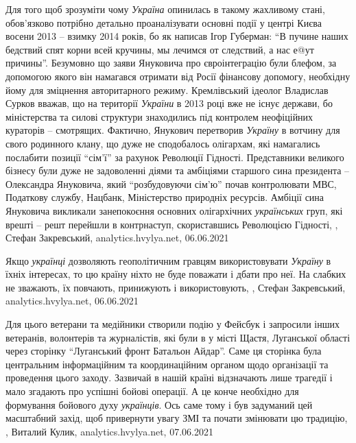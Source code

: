 Для того щоб зрозуміти чому \emph{Україна} опинилась в такому жахливому стані,
обов'язково потрібно детально проаналізувати основні події у центрі Києва
восени 2013 – взимку 2014 років, бо як написав Ігор Губерман: \enquote{В пучине наших
бедствий спят корни всей кручины, мы лечимся от следствий, а нас е@ут причины}.
Безумовно що заяви Януковича про євроінтеграцію були блефом, за допомогою якого
він намагався отримати від Росії фінансову допомогу, необхідну йому для
зміцнення авторитарного режиму. Кремлівський ідеолог Владислав Сурков вважав,
що на території \emph{України} в 2013 році вже не існує держави, бо міністерства та
силові структури знаходились під контролем неофіційних кураторів – смотрящих.
Фактично, Янукович перетворив \emph{Україну} в вотчину для свого родинного клану, що
дуже не сподобалось олігархам, які намагались послабити позиції \enquote{сім'ї} за
рахунок Революції Гідності. Представники великого бізнесу були дуже не
задоволенні діями та амбіціями старшого сина президента – Олександра Януковича,
який \enquote{розбудовуючи сім'ю} почав контролювати МВС, Податкову службу, Нацбанк,
Міністерство природніх ресурсів. Амбіції сина Януковича викликали занепокоєння
основних олігархічних \emph{українських} груп, які врешті – решт перейшли в
контрнаступ, скориставшись Революцією Гідності,
, Стефан Закревський, analytics.hvylya.net, 06.06.2021

Якщо \emph{українці} дозволяють геополітичним гравцям використовувати \emph{Україну} в їхніх
інтересах, то цю країну ніхто не буде поважати і дбати про неї. На слабких не
зважають, їх повчають, принижують і використовують,
, Стефан Закревський, analytics.hvylya.net, 06.06.2021

Для цього ветерани та медійники створили подію у Фейсбук і запросили інших
ветеранів, волонтерів та журналістів, які були в у місті Щастя, Луганської
області через сторінку \enquote{Луганський фронт Батальон Айдар}. Саме ця сторінка була
центральним інформаційним та координаційним органом щодо організації та
проведення цього заходу.  Зазвичай в нашій країні відзначають лише трагедії і
мало згадають про успішні бойові операції. А це конче необхідно для формування
бойового духу \emph{українців}. Ось саме тому і був задуманий цей масштабний захід,
щоб привернути увагу ЗМІ та почати змінювати цю традицію,
, Виталий Кулик, analytics.hvylya.net, 07.06.2021

